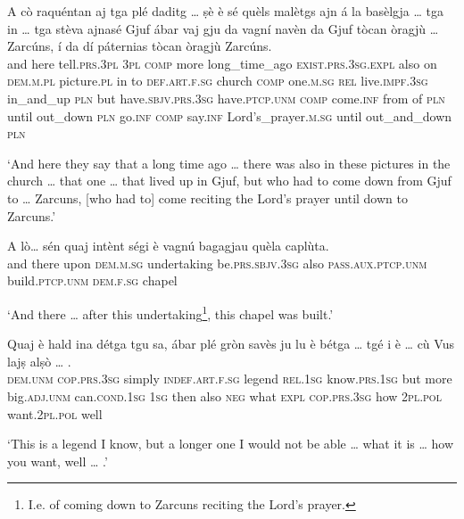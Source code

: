 \begin{linenumbers}
\gll A cò raquéntan aj tga plé daditg … ṣè è sé quèls malètgs ajn á la basèlgja … tga in … tga stèva ajnasé Gjuf ábar vaj gju da vagní navèn da Gjuf tòcan òragjù … Zarcúns, í da dí páternias tòcan òragjù Zarcúns.\\
and here tell.\textsc{prs.3pl} \textsc{3pl} \textsc{comp} more long\_time\_ago {} \textsc{exist.prs.3sg.expl} also on \textsc{dem.m.pl} picture.\textsc{pl} in to \textsc{def.art.f.sg} church {} \textsc{comp} one.\textsc{m.sg} {} \textsc{rel} live.\textsc{impf.3sg} in\_and\_up \textsc{pln} but  have.\textsc{sbjv.prs.3sg} have.\textsc{ptcp.unm} \textsc{comp} come.\textsc{inf} from of \textsc{pln} until out\_down {} \textsc{pln} go.\textsc{inf} \textsc{comp} say.\textsc{inf} Lord's\_prayer.\textsc{m.sg} until out\_and\_down \textsc{pln}\\
\end{linenumbers}
\medskip
\glt `And here they say that a long time ago … there was also in these pictures in the church … that one … that lived up in Gjuf, but who had to come down from Gjuf to … Zarcuns, [who had to] come reciting the Lord's prayer until down to Zarcuns.'
\medskip

\begin{linenumbers}
\gll    A lò… sén quaj intènt ségi è vagnú bagagjau quèla caplùta.\\
and there upon \textsc{dem.m.sg} undertaking be.\textsc{prs.sbjv.3sg} also \textsc{pass.aux.ptcp.unm} build.\textsc{ptcp.unm} \textsc{dem.f.sg} chapel \\
\end{linenumbers}
\medskip
\glt `And there … after this undertaking\footnote{I.e. of coming down to Zarcuns reciting the Lord's prayer.}, this chapel was built.'
\medskip

\begin{linenumbers}
\gll    Quaj è hald ina détga tgu sa, ábar plé gròn savès ju lu è bétga … tgé i è … cù Vus lajṣ alṣò … .\\
 \textsc{dem.unm} \textsc{cop.prs.3sg} simply \textsc{indef.art.f.sg} legend \textsc{rel.1sg} know.\textsc{prs.1sg} but more big.\textsc{adj.unm} can.\textsc{cond.1sg} \textsc{1sg} then also \textsc{neg} {} what \textsc{expl}  \textsc{cop.prs.3sg} {} how \textsc{2pl.pol} want.\textsc{2pl.pol} well\\
\end{linenumbers}
\medskip
\glt `This is a legend I know, but a longer one I would not be able … what it is … how you want, well … .'
\bigskip


